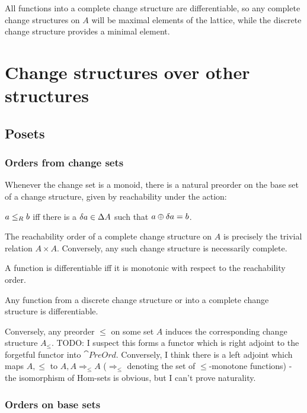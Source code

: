 All functions into a complete change structure are differentiable, so any
complete change structures on $A$ will be maximal elements of the lattice, while
the discrete change structure provides a minimal element.

\section{Change structures over other structures}
\label{sec:moreStructures}

\subsection{Posets}
\subsubsection{Orders from change sets}

Whenever the change set is a monoid, 
there is a natural preorder on the base set of a change structure, given by reachability
 under the action:
\begin{defn}
  $a \leq_R b$ iff there is a $\delta a \in \Delta A$ such that $a \oplus
  \delta a = b$.
\end{defn}

The reachability order of a complete change structure on $A$ is precisely the trivial relation
$A \times A$. Conversely, any such change structure is necessarily complete.

\begin{prop}
  A function is differentiable iff it is monotonic with respect to the
  reachability order.
\end{prop}

\begin{corollary}
  Any function from a discrete change structure or into a complete change
  structure is differentiable.
\end{corollary}

Conversely, any preorder $\leq$ on some set $A$ induces the corresponding change structure
$A_\leq$.
TODO: I suspect this forms a functor which is right adjoint to the forgetful functor into $\cat{PreOrd}$.
Conversely, I think there is a left adjoint which maps $A, \leq$ to $A, A \Rightarrow_\leq A$ ($\Rightarrow_\leq$
denoting the set of $\leq$-monotone functions) - the isomorphism of Hom-sets is obvious, but I can't prove naturality.

\subsubsection{Orders on base sets}

